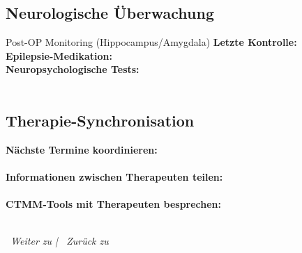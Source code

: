 \subsection*{\textcolor{ctmmPurple}{Neurologische Überwachung}}

\begin{ctmmOrangeBox}{Post-OP Monitoring (Hippocampus/Amygdala)}
\textbf{Letzte Kontrolle:}  \\[0.3cm]
\textbf{Epilepsie-Medikation:}  \\[0.3cm]
\textbf{Neuropsychologische Tests:} \\
 \quad {} \\
 \quad {} 
\end{ctmmOrangeBox}

\subsection*{\textcolor{ctmmPurple}{Therapie-Synchronisation}}

\textbf{Nächste Termine koordinieren:} \\
\\[0.3cm]

\textbf{Informationen zwischen Therapeuten teilen:} \\
\\[0.3cm]

\textbf{CTMM-Tools mit Therapeuten besprechen:} \\
 \quad {} \\
 \quad {}

\vspace{1cm}
\begin{center}
\textit{\textcolor{ctmmGreen}{\faChevronRight~Weiter zu}  | \textcolor{ctmmPurple}{\faChevronLeft~Zurück zu} }
\end{center}
